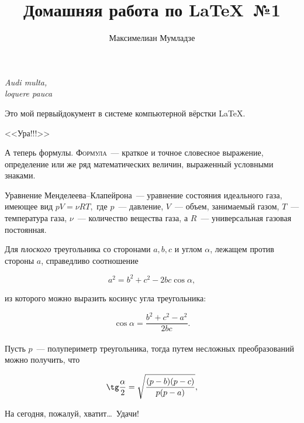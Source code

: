 \documentclass[12pt]{article}
\title{Домашняя работа по \LaTeX ~№1}
\author{Максимелиан Мумладзе}
\date{}
\begin{document}
\maketitle

\begin{flushright}
\hfill\textit{Audi multa,\\loquere pauca}
\end{flushright}

\vspace{20pt}

Это мой первый\iffalse в кольце вычета $\approx 20$)\fi документ в системе компьютерной вёрстки \LaTeX.

\begin{center}
\Huge{\sffamily <<Ура!!!>>}
\end{center}

А теперь формулы. \textsc{Формула}~--- краткое и точное словесное выражение, определение или же ряд математических величин, выраженный условными знаками.

\vspace{15pt}

\hspace{28pt}{\large\bfseries Термодинамика}

Уравнение Менделеева--Клапейрона~--- уравнение состояния идеального газа, имеющее вид $pV = \nu RT,$ где $p$~--- давление, $V$~--- объем, занимаемый газом, $T$~--- температура газа, $\nu$~--- количество вещества газа, а $R$~--- универсальная газовая постоянная.

\vspace{15pt}

\hspace{28pt}{\large\bfseries Геометрия \hfill Планиметрия}

Для \textsl{плоского} треугольника со сторонами $a, b, c$ и углом $\alpha$, лежащем против стороны $a$, справедливо соотношение

$$
a^2 = b^2 + c^2 - 2 b c \cos\alpha,
$$

из которого можно выразить косинус угла треугольника:

$$
\cos\alpha = \frac{b^2 + c^2 - a^2}{2bc}.
$$\\

Пусть $p$~--- полупериметр треугольника, тогда путем несложных преобразований можно получить, что 

$$
\tg\frac{\alpha}{2} = \sqrt{\frac{(p - b)(p - c)}{p(p - a)}},
$$

\vspace{1cm}

На сегодня, пожалуй, хватит\dots ~Удачи!
\end{document}
